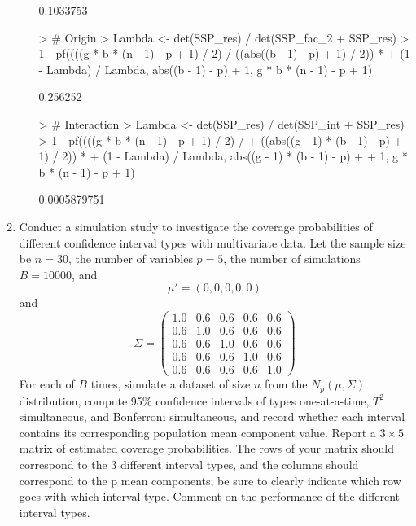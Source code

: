 \documentclass[12pt,a4paper]{paper}
\begin{document}
\begin{enumerate}
\begin{enumerate}
\begin{Schunk}
\begin{Soutput}
[1] 0.1033753
\end{Soutput}
\begin{Sinput}
> # Origin
> Lambda <- det(SSP_res) / det(SSP_fac_2 + SSP_res)
> 1 - pf((((g * b * (n - 1) - p + 1) / 2) / ((abs((b - 1) - p) + 1) / 2)) * 
+   (1 - Lambda) / Lambda, abs((b - 1) - p) + 1, g * b * (n - 1) - p + 1)
\end{Sinput}
\begin{Soutput}
[1] 0.256252
\end{Soutput}
\begin{Sinput}
> # Interaction
> Lambda <- det(SSP_res) / det(SSP_int + SSP_res)
> 1 - pf((((g * b * (n - 1) - p + 1) / 2) / 
+           ((abs((g - 1) * (b - 1) - p) + 1) / 2)) * 
+   (1 - Lambda) / Lambda, abs((g - 1) * (b - 1) - p) + 
+     1, g * b * (n - 1) - p + 1)
\end{Sinput}
\begin{Soutput}
[1] 0.0005879751
\end{Soutput}
\end{Schunk}
\end{enumerate}
\item Conduct a simulation study to investigate the coverage probabilities of different confidence
interval types with multivariate data. Let the sample size be $n = 30$, the number of variables $p = 5$, the number of simulations $B = 10000$, and \[\mu' =\left(0, 0, 0, 0, 0\right)\] and \[\Sigma = \left(\begin{array}{ccccc}1.0&0.6&0.6&0.6&0.6\\0.6&1.0&0.6&0.6&0.6\\0.6&0.6&1.0&0.6&0.6\\0.6&0.6&0.6&1.0&0.6\\0.6&0.6&0.6&0.6&1.0\end{array}\right)\] For each of $B$ times, simulate a dataset of size $n$ from the $N_{p}\left(\mu,\Sigma\right)$ distribution, compute 95\% confidence intervals of types one-at-a-time, $T^{2}$ simultaneous, and Bonferroni simultaneous, and record whether each interval contains its corresponding population mean component value. Report a $3 \times 5$ matrix of estimated coverage probabilities. The rows of your matrix should correspond to the 3 different interval types, and the columns should correspond to the p mean components; be sure to clearly indicate which row goes with which interval type. Comment on the performance of the different interval types.
\begin{Schunk}
\begin{Sinput}

\end{Sinput}
\end{Schunk}
\end{enumerate}
\end{document}
